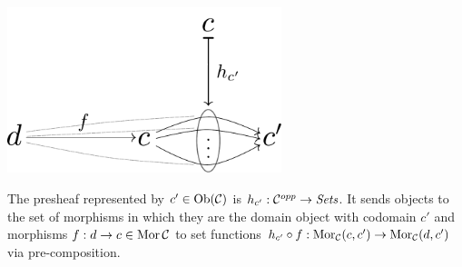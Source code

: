 \begin{frame}
\centering\includegraphics[width=0.6\textwidth]{fig/hom.pdf}

\begin{block}{}
The presheaf represented by $c' \in \mathop{\rm Ob}\nolimits({\mathcal C})$ is $h_{c'} : {\mathcal C}^{opp} \rightarrow \textit{Sets}$. It sends objects to the set of morphisms in which they are the domain object with codomain $c'$ and morphisms $f:d \rightarrow c \in \mathop{\rm Mor}\nolimits{{\mathcal C}}$ to set functions $h_{c'} \circ f: \mathop{\rm Mor}\nolimits_{{\mathcal C}}(c,c') \rightarrow \mathop{\rm Mor}\nolimits_{{\mathcal C}}(d,c')$ via pre-composition.
\end{block}
\end{frame}